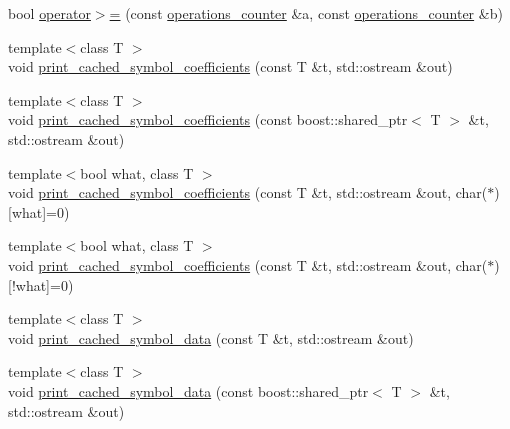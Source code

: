 \begin{DoxyCompactItemize}
\item 
bool \hyperlink{namespacekodo_a219bba3ea747706cc4003c53bb5d1cad}{operator$>$=} (const \hyperlink{structkodo_1_1operations__counter}{operations\-\_\-counter} \&a, const \hyperlink{structkodo_1_1operations__counter}{operations\-\_\-counter} \&b)
\item 
{\footnotesize template$<$class T $>$ }\\void \hyperlink{group__generic__api_ga0f23c8aa6a9df27288999a56ef0a0dfa}{print\-\_\-cached\-\_\-symbol\-\_\-coefficients} (const T \&t, std\-::ostream \&out)
\item 
{\footnotesize template$<$class T $>$ }\\void \hyperlink{group__generic__api_ga738799d8f76f36e79fb8cb9ebcef752b}{print\-\_\-cached\-\_\-symbol\-\_\-coefficients} (const boost\-::shared\-\_\-ptr$<$ T $>$ \&t, std\-::ostream \&out)
\begin{DoxyCompactList}\small\item\em \end{DoxyCompactList}\item 
{\footnotesize template$<$bool what, class T $>$ }\\void \hyperlink{group__generic__api_ga1145d50be325131c13fe37d7ab904969}{print\-\_\-cached\-\_\-symbol\-\_\-coefficients} (const T \&t, std\-::ostream \&out, char($\ast$)\mbox{[}what\mbox{]}=0)
\begin{DoxyCompactList}\small\item\em \end{DoxyCompactList}\item 
{\footnotesize template$<$bool what, class T $>$ }\\void \hyperlink{group__generic__api_ga2be16badfbd7d704927588182b7e8d14}{print\-\_\-cached\-\_\-symbol\-\_\-coefficients} (const T \&t, std\-::ostream \&out, char($\ast$)\mbox{[}!what\mbox{]}=0)
\begin{DoxyCompactList}\small\item\em \end{DoxyCompactList}\item 
{\footnotesize template$<$class T $>$ }\\void \hyperlink{group__generic__api_ga080a3e36453ee6c8de96e7af13d4f936}{print\-\_\-cached\-\_\-symbol\-\_\-data} (const T \&t, std\-::ostream \&out)
\item 
{\footnotesize template$<$class T $>$ }\\void \hyperlink{group__generic__api_ga4ff9ca7a1a94d833b26ef306da5a9641}{print\-\_\-cached\-\_\-symbol\-\_\-data} (const boost\-::shared\-\_\-ptr$<$ T $>$ \&t, std\-::ostream \&out)

\end{DoxyCompactItemize}
